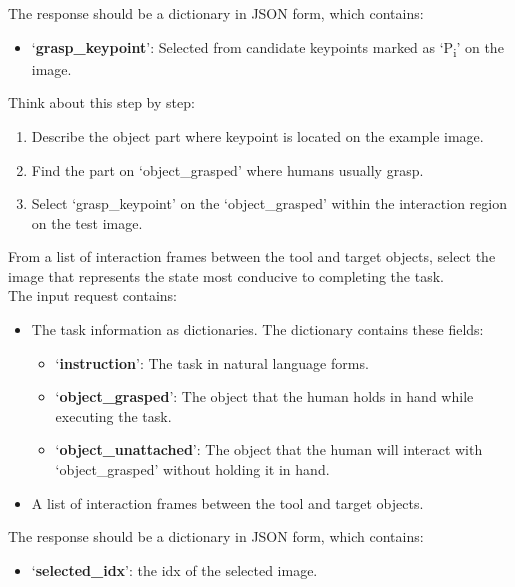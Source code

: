 \begin{center}
\begin{tcolorbox}[colback=gray!5, colframe=black!40, sharp corners=south, title= Grasp Point Transfer Prompt]
The response should be a dictionary in JSON form, which contains:
\begin{itemize}
    \item `\textbf{grasp\_keypoint}': Selected from candidate keypoints marked as `P\textsubscript{i}' on the image. \\
\end{itemize}

Think about this step by step:
\begin{enumerate}[leftmargin=*, label=\arabic*.]
    \item Describe the object part where keypoint is located on the example image.
    \item Find the part on `object\_grasped’ where humans usually grasp.
    \item Select `grasp\_keypoint' on the `object\_grasped' within the interaction region on the test image.
\end{enumerate}
\end{tcolorbox}
\end{center}



\begin{center}
\begin{tcolorbox}[colback=gray!5, colframe=black!40, sharp corners=south, title= Function Axis Alignment Prompt]

From a list of interaction frames between the tool and target objects, select the image that represents the state most conducive to completing the task. \\


The input request contains:  
\begin{itemize}
    \item The task information as dictionaries. The dictionary contains these fields: 
    \begin{itemize}
        \item `\textbf{instruction}': The task in natural language forms.
        \item `\textbf{object\_grasped}': The object that the human holds in hand while executing the task.
        \item `\textbf{object\_unattached}': The object that the human will interact with `object\_grasped' without holding it in hand.
    \end{itemize}
    \item A list of interaction frames between the tool and target objects. \\
\end{itemize} 

The response should be a dictionary in JSON form, which contains:
\begin{itemize}
    \item `\textbf{selected\_idx}': the idx of the selected image.
\end{itemize}
\end{tcolorbox}
\end{center}

